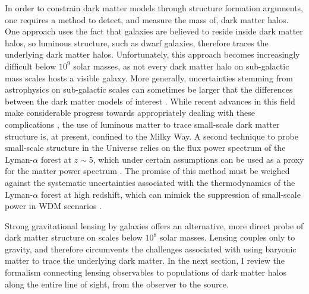 In order to constrain dark matter models through structure formation arguments, one requires a method to detect, and measure the mass of, dark matter halos. One approach uses the fact that galaxies are believed to reside inside dark matter halos, so luminous structure, such as dwarf galaxies, therefore traces the underlying dark matter halos. Unfortunately, this approach becomes increasingly difficult below $10^9$ solar masses, as not every dark matter halo on sub-galactic mass scales hosts a visible galaxy. More generally, uncertainties stemming from astrophysics on sub-galactic scales can sometimes be larger that the differences between the dark matter models of interest \cite{Nierenberg++16}. While recent advances in this field make considerable progress towards appropriately dealing with these complications \cite{Nadler++19}, the use of luminous matter to trace small-scale dark matter structure is, at present, confined to the Milky Way. A second technique to probe small-scale structure in the Universe relies on the flux power spectrum of the Lyman-$\alpha$ forest at $z \sim 5$, which under certain assumptions can be used as a proxy for the matter power spectrum \cite{Viel13,Irsic++17}. The promise of this method must be weighed against the systematic uncertainties associated with the thermodynamics of the Lyman-$\alpha$ forest at high redshift, which can mimick the suppression of small-scale power in WDM scenarios \cite{Garzilli++19}. 

Strong gravitational lensing by galaxies offers an alternative, more direct probe of dark matter structure on scales below $10^8$ solar masses. Lensing couples only to gravity, and therefore circumvents the challenges associated with using baryonic matter to trace the underlying dark matter. In the next section, I review the formalism connecting lensing observables to populations of dark matter halos along the entire line of sight, from the observer to the source. 

